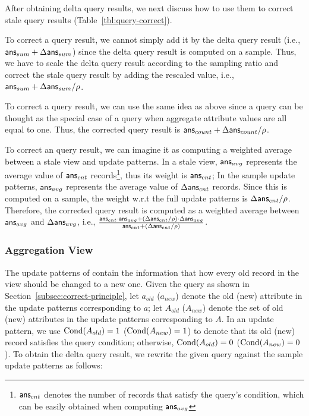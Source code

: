 After obtaining delta query results, we next discuss how to use them to correct stale query results (Table~\ref{tbl:query-correct}).

To correct a \sumfunc query result, we cannot simply add it by the delta query result (i.e., $\textsf{ans}_{sum}+\Delta\textsf{ans}_{sum}$) since the delta query result is computed on a sample. Thus, we have to scale the delta query result according to the sampling ratio and correct the stale query result by adding the rescaled value, i.e., $\textsf{ans}_{sum}+\Delta\textsf{ans}_{sum}/\rho $. 

To correct a \countfunc query result, we can use the same idea as above since a \countfunc query can be thought as the special case of a \sumfunc query when aggregate attribute values are all equal to one. Thus, the corrected \countfunc query result is $\textsf{ans}_{count}+\Delta\textsf{ans}_{count}/\rho $.

To correct an \avgfunc query result, we can imagine it as computing a weighted average between a stale view and update patterns. In a stale view, $\textsf{ans}_{avg}$ represents the average value of $\textsf{ans}_{cnt}$ records\footnote{\small $\textsf{ans}_{cnt}$ denotes the number of records that satisfy the \avgfunc query's condition, which can be easily obtained when computing $\textsf{ans}_{avg}$}, thus its weight is $\textsf{ans}_{cnt}$; In the sample update patterns, $\textsf{ans}_{avg}$ represents the average value of $\Delta\textsf{ans}_{cnt}$ records. Since this is computed on a sample, the weight w.r.t the full update patterns is  $\Delta\textsf{ans}_{cnt}/\rho $. Therefore, the corrected \avgfunc query result is computed as a weighted average between $\textsf{ans}_{avg}$ and $\Delta\textsf{ans}_{avg}$, i.e., $\frac{\textsf{ans}_{cnt}\cdot\textsf{ans}_{avg}+(\Delta\textsf{ans}_{cnt}/\rho )\cdot\Delta\textsf{ans}_{avg}}{\textsf{ans}_{cnt}+(\Delta\textsf{ans}_{cnt}/\rho )}$.




\subsubsection{Aggregation View}\label{subsubsec:correct-agg}

\sloppy

The update patterns of \aggview contain the information that how every old record in the view should be changed to a new one. Given the query as shown in Section~\ref{subsec:correct-principle}, let $a_{old}$ ($a_{new}$) denote the old (new) attribute in the update patterns corresponding to $a$; let $A_{old}$ ($A_{new}$) denote the set of old (new) attributes in the update patterns corresponding to $A$.
In an update pattern, we use $\textrm{Cond}(A_{old})=1$ ($\textrm{Cond}(A_{new})=1$) to denote that its old (new) record satisfies the query condition; otherwise, $\textrm{Cond}({A_{old}})=0$ ($\textrm{Cond}({A_{new}})=0$). 
To obtain the delta query result, we rewrite the given query against the sample update patterns as follows:

